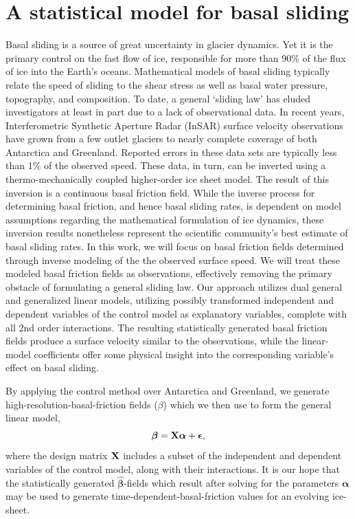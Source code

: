 

\chapter{A statistical model for basal sliding}

Basal sliding is a source of great uncertainty in glacier dynamics.  Yet it is the primary control on the fast flow of ice, responsible for more than 90\% of the flux of ice into the Earth's oceans.  Mathematical models of basal sliding typically relate the speed of sliding to the shear stress as well as basal water pressure, topography, and composition.  To date, a general `sliding law' has eluded investigators at least in part due to a lack of observational data.  In recent years, Interferometric Synthetic Aperture Radar (InSAR) surface velocity observations have grown from a few outlet glaciers to nearly complete coverage of both Antarctica and Greenland.  Reported errors in these data sets are typically less than 1\% of the observed speed.  These data, in turn, can be inverted using a thermo-mechanically coupled higher-order ice sheet model.  The result of this inversion is a continuous basal friction field.  While the inverse process for determining basal friction, and hence basal sliding rates, is dependent on model assumptions regarding the mathematical formulation of ice dynamics, these inversion results nonetheless represent the scientific community's best estimate of basal sliding rates.  In this work, we will focus on basal friction fields determined through inverse modeling of the the observed surface speed.  We will treat these modeled basal friction fields as observations, effectively removing the primary obstacle of formulating a general sliding law.  Our approach utilizes dual general and generalized linear models, utilizing possibly transformed independent and dependent variables of the control model as explanatory variables, complete with all 2nd order interactions.  The resulting statistically generated basal friction fields produce a surface velocity similar to the observations, while the linear-model coefficients offer some physical insight into the corresponding variable's effect on basal sliding.

By applying the control method \citep{macayeal_1993} over Antarctica and Greenland, we generate high-resolution-basal-friction fields ($\beta$) which we then use to form the general linear model, 
$$\bm{\beta} = \mathbf{X} \bm{\alpha} + \bm{\epsilon},$$
where the design matrix $\mathbf{X}$ includes a subset of the independent and dependent variables of the control model, along with their interactions.  It is our hope that the statistically generated $\bm{\hat{\beta}}$-fields which result after solving for the parameters $\bm{\alpha}$ may be used to generate time-dependent-basal-friction values for an evolving ice-sheet.

